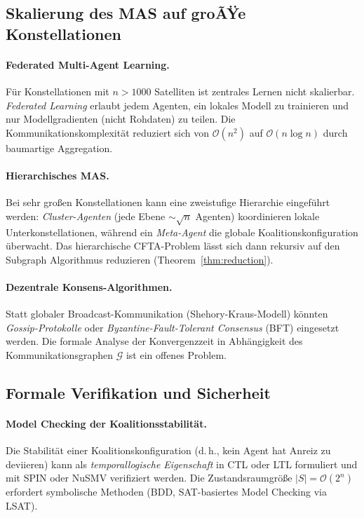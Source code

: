﻿\documentclass[a4paper,12pt]{article}
\theoremstyle{definition}
\begin{document}
\subsection{Skalierung des MAS auf groÃŸe Konstellationen}

\paragraph{Federated Multi-Agent Learning.}
F\"ur Konstellationen mit $n > 1000$ Satelliten ist zentrales Lernen
nicht skalierbar. \emph{Federated Learning} erlaubt jedem Agenten,
ein lokales Modell zu trainieren und nur Modellgradienten
(nicht Rohdaten) zu teilen.
Die Kommunikationskomplexit\"at reduziert sich von $\mathcal{O}(n^2)$
auf $\mathcal{O}(n \log n)$ durch baumartige Aggregation.

\paragraph{Hierarchisches MAS.}
Bei sehr gro\ss{}en Konstellationen kann eine zweistufige
Hierarchie eingef\"uhrt werden: \emph{Cluster-Agenten} (jede Ebene $\sim\sqrt{n}$ Agenten)
koordinieren lokale Unterkonstellationen, w\"ahrend ein
\emph{Meta-Agent} die globale Koalitionskonfiguration \"uberwacht.
Das hierarchische CFTA-Problem l\"asst sich dann rekursiv auf
den Subgraph Algorithmus reduzieren (Theorem~\ref{thm:reduction}).

\paragraph{Dezentrale Konsens-Algorithmen.}
Statt globaler Broadcast-Kommunikation (Shehory-Kraus-Modell)
k\"onnten \emph{Gossip-Protokolle} oder \emph{Byzantine-Fault-Tolerant
Consensus} (BFT) eingesetzt werden. Die formale Analyse der
Konvergenzzeit in Abh\"angigkeit des Kommunikationsgraphen
$\mathcal{G}$ ist ein offenes Problem.

\subsection{Formale Verifikation und Sicherheit}

\paragraph{Model Checking der Koalitionsstabilit\"at.}
Die Stabilit\"at einer Koalitionskonfiguration (d.\,h., kein Agent hat
Anreiz zu deviieren) kann als \emph{temporallogische Eigenschaft}
in CTL oder LTL formuliert und mit SPIN oder NuSMV verifiziert werden.
Die Zustandsraumgr\"o\ss{}e $|S| = \mathcal{O}(2^n)$ erfordert symbolische
Methoden (BDD, SAT-basiertes Model Checking via LSAT).
\end{document}

